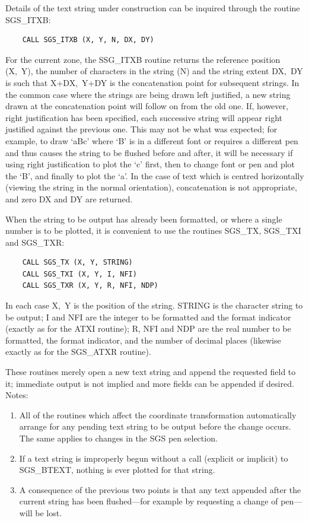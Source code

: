 \documentclass[11pt]{article}
\newcommand{\htmlref}[2]{#1}
\begin{document}
Details of the text string under construction can be inquired
through the routine \htmlref{SGS\_ITXB}{SGS_ITXB}:
\begin{verbatim}
    CALL SGS_ITXB (X, Y, N, DX, DY)
\end{verbatim}
For the current zone, the SSG\_ITXB
routine returns the reference position (X,~Y),
the number of characters in the string (N) and
the string extent DX,~DY is such that X+DX,~Y+DY is the concatenation
point for subsequent strings.  In the common case where the strings
are being drawn left justified, a new string drawn at the concatenation
point will follow on from the old one.  If, however, right justification
has been specified, each successive string will appear right justified
against the previous one.  This may not be what was expected;  for
example, to draw `aBc' where `B' is in a different font or requires a
different pen and thus causes the string to be flushed before and after,
it will be necessary if using right justification to plot the `c'
first, then to change font or pen and plot the `B', and finally to plot
the `a'.  In the case of text which is centred horizontally (viewing
the string in the normal orientation), concatenation is not appropriate,
and zero DX and DY are returned.

When the string to be output has already been formatted, or where
a single number is to be plotted, it is convenient to use the
routines SGS\_TX, SGS\_TXI and SGS\_TXR:
\begin{verbatim}
    CALL SGS_TX (X, Y, STRING)
    CALL SGS_TXI (X, Y, I, NFI)
    CALL SGS_TXR (X, Y, R, NFI, NDP)
\end{verbatim}
In each case X,~Y is the position of the string.  STRING is the
character string to be output;  I and NFI are the integer to be
formatted and the format indicator (exactly as for the ATXI
routine);  R, NFI and NDP are the real number to be formatted,
the format indicator, and the number of decimal places (likewise
exactly as for the SGS\_ATXR routine).

These routines merely open a new text string and append the
requested field to it;  immediate
output is not implied and more fields can be appended if
desired.
\goodbreak
Notes:
\begin{enumerate}
\item All of the routines which affect the coordinate transformation
automatically arrange for any pending text string to
be output before the change occurs.  The same applies to
changes in the SGS pen selection.
\item If a text string is improperly begun without a call (explicit
or implicit) to SGS\_BTEXT, nothing is ever plotted for
that string.
\item A consequence of the previous two points is that any text
appended after the current string has been flushed---for
example by requesting a change of pen---will
be lost.
\end{enumerate}
\end{document}
